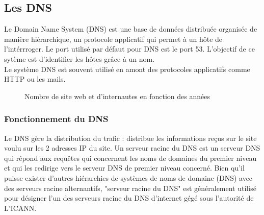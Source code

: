 \documentclass[12pt, a4paper]{article}
\begin{document}
\subsection{Les DNS}
Le Domain Name System (DNS) est une base de données distribuée organisée de manière
hiérarchique, un protocole applicatif qui permet à un hôte de l'intérrroger. Le
port utilisé par défaut pour DNS est le port 53. L'objectif de ce sytème est
d'identifier les hôtes grâce à un nom. \\
Le système DNS est souvent utilisé en amont des protocoles applicatifs comme 
HTTP ou les mails.\\

\begin{figure}[H]
\centering
{}
\caption{Nombre de site web et d'internautes en fonction des années}
\end{figure}
    
    \subsubsection{Fonctionnement du DNS}
    Le DNS gère la distribution du trafic : distribue les informations
    reçus sur le site voulu sur les 2 adresses IP du site.
    Un serveur racine du DNS est un serveur DNS qui répond aux requêtes qui concernent les noms de
    domaines du premier niveau et qui les redirige vers le serveur DNS de premier niveau concerné.
    Bien qu'il puisse exister d'autres hiérarchies de systèmes de noms de domaine (DNS) avec des serveurs
    racine alternantifs, "serveur racine du DNS" est généralement utilisé pour 
    désigner l'un des serveurs racine du DNS d'internet gégé sous l'autorité de L'ICANN.
\newpage 
\end{document}
